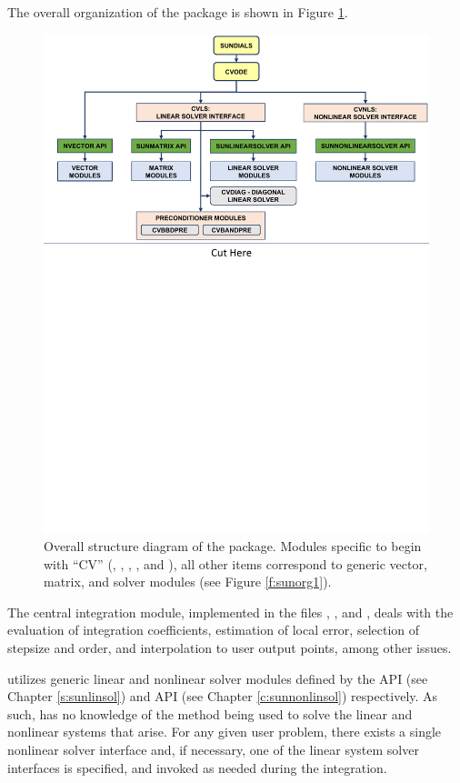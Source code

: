 The overall organization of the {\cvode} package is shown in Figure
\ref{f:cvorg}.
\begin{figure}[!htb]
{\centerline{\includegraphics[width=\textwidth]{cvorg}}}
\caption [Overall structure diagram of the {\cvode} package]
{Overall structure diagram of the {\cvode} package.
  Modules specific to {\cvode} begin with ``CV'' ({\cvls},  {\cvnls}, {\cvdiag},
  {\cvbbdpre}, and {\cvbandpre}), all other items correspond to generic
  {\sundials} vector, matrix, and solver modules (see Figure \ref{f:sunorg1}).}
\label{f:cvorg}
\end{figure}
The central integration module, implemented in the files ,
, and , deals with the evaluation of integration
coefficients, estimation of local
error, selection of stepsize and order, and interpolation to user output
points, among other issues.

{\cvode} utilizes generic linear and nonlinear solver modules defined by the
{\sunlinsol} API (see Chapter \ref{s:sunlinsol}) and {\sunnonlinsol} API (see
Chapter \ref{c:sunnonlinsol}) respectively. As such, {\cvode} has no knowledge
of the method being used to solve the linear and nonlinear systems that
arise. For any given user problem, there exists a single nonlinear solver
interface and, if necessary, one of the linear system solver interfaces is
specified, and invoked as needed during the integration.

